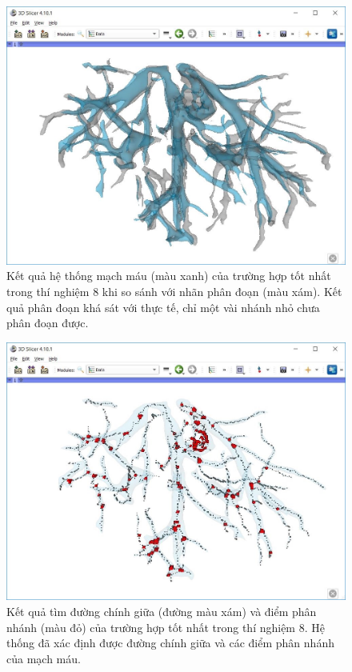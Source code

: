 	\begin{figure}[h!]
		\includegraphics[width=\textwidth]{figures/result_e8_best_comparison}
		\caption[Kết quả hệ thống mạch máu của trường hợp tốt nhất trong thí nghiệm 8 và nhãn phân đoạn.]{Kết quả hệ thống mạch máu (màu xanh) của trường hợp tốt nhất trong thí nghiệm 8 khi so sánh với nhãn phân đoạn (màu xám). Kết quả phân đoạn khá sát với thực tế, chỉ một vài nhánh nhỏ chưa phân đoạn được.}
		\label{fig:result_e8_best_comparison}
	\end{figure}
	\begin{figure}[h!]
		\includegraphics[width=\textwidth]{figures/result_e8_best_skeleton_branching_point}
		\caption[Kết quả tìm đường chính giữa và điểm phân nhánh của trường hợp tốt nhất trong thí nghiệm 8.]{Kết quả tìm đường chính giữa (đường màu xám) và điểm phân nhánh (màu đỏ) của trường hợp tốt nhất trong thí nghiệm 8. Hệ thống đã xác định được đường chính giữa và các điểm phân nhánh của mạch máu.}
		\label{fig:result_e8_best_skeleton_branching_point}
	\end{figure}
